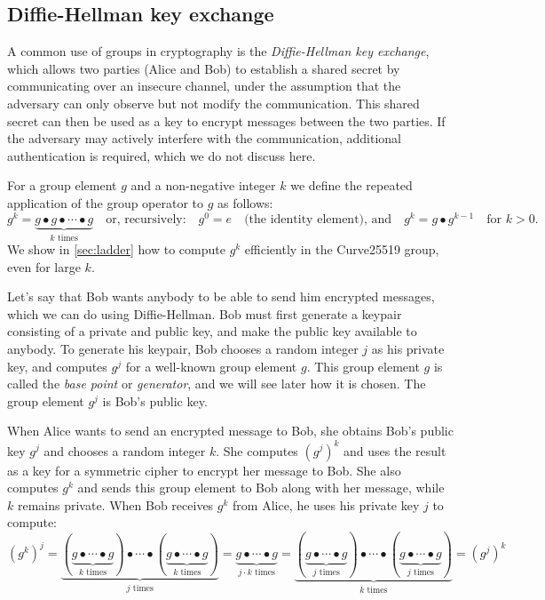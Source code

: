 \documentclass[manuscript]{acmart}
\begin{document}
\subsection{Diffie-Hellman key exchange}\label{sec:diffie-hellman}

A common use of groups in cryptography is the \emph{Diffie-Hellman key exchange}, which allows two parties (Alice and Bob) to establish a shared secret by communicating over an insecure channel, under the assumption that the adversary can only observe but not modify the communication.
This shared secret can then be used as a key to encrypt messages between the two parties.
If the adversary may actively interfere with the communication, additional authentication is required, which we do not discuss here.

For a group element $g$ and a non-negative integer $k$ we define the repeated application of the group operator to $g$ as follows:
\begin{equation}\label{eq:power}
    g^k = \underbrace{g \bullet g \bullet \cdots \bullet g}_\text{$k$ times} \quad\text{or, recursively:}\quad
    g^0 = e \quad\text{(the identity element), and}\quad g^k = g \bullet g^{k-1} \quad\text{for } k>0.
\end{equation}
We show in \autoref{sec:ladder} how to compute $g^k$ efficiently in the Curve25519 group, even for large $k$.

Let's say that Bob wants anybody to be able to send him encrypted messages, which we can do using Diffie-Hellman.
Bob must first generate a keypair consisting of a private and public key, and make the public key available to anybody.
To generate his keypair, Bob chooses a random integer $j$ as his private key, and computes $g^j$ for a well-known group element $g$.
This group element $g$ is called the \emph{base point} or \emph{generator}, and we will see later how it is chosen.
The group element $g^j$ is Bob's public key.

When Alice wants to send an encrypted message to Bob, she obtains Bob's public key $g^j$ and chooses a random integer $k$.
She computes $(g^j)^k$ and uses the result as a key for a symmetric cipher to encrypt her message to Bob.
She also computes $g^k$ and sends this group element to Bob along with her message, while $k$ remains private.
When Bob receives $g^k$ from Alice, he uses his private key $j$ to compute:
\begin{equation*}
(g^k)^j =
\underbrace{(\underbrace{g \bullet\cdots\bullet g}_\text{$k$ times}) \bullet\cdots\bullet (\underbrace{g \bullet\cdots\bullet g}_\text{$k$ times})}_\text{$j$ times} =
\underbrace{g \bullet\cdots\bullet g}_\text{$j \cdot k$ times} =
\underbrace{(\underbrace{g \bullet\cdots\bullet g}_\text{$j$ times}) \bullet\cdots\bullet (\underbrace{g \bullet\cdots\bullet g}_\text{$j$ times})}_\text{$k$ times} =
(g^j)^k
\end{equation*}
\end{document}
